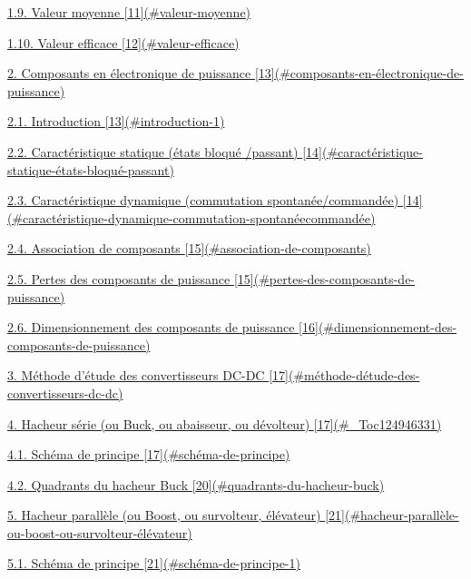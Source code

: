 \protect\hyperlink{valeur-moyenne}{1.9. Valeur moyenne {[}11{]}(\#valeur-moyenne)}

\protect\hyperlink{valeur-efficace}{1.10. Valeur efficace {[}12{]}(\#valeur-efficace)}

\protect\hyperlink{composants-en-uxe9lectronique-de-puissance}{2. Composants en électronique de puissance {[}13{]}(\#composants-en-électronique-de-puissance)}

\protect\hyperlink{introduction-1}{2.1. Introduction {[}13{]}(\#introduction-1)}

\protect\hyperlink{caractuxe9ristique-statique-uxe9tats-bloquuxe9-passant}{2.2. Caractéristique statique (états bloqué /passant) {[}14{]}(\#caractéristique-statique-états-bloqué-passant)}

\protect\hyperlink{caractuxe9ristique-dynamique-commutation-spontanuxe9ecommanduxe9e}{2.3. Caractéristique dynamique (commutation spontanée/commandée) {[}14{]}(\#caractéristique-dynamique-commutation-spontanéecommandée)}

\protect\hyperlink{association-de-composants}{2.4. Association de composants {[}15{]}(\#association-de-composants)}

\protect\hyperlink{pertes-des-composants-de-puissance}{2.5. Pertes des composants de puissance {[}15{]}(\#pertes-des-composants-de-puissance)}

\protect\hyperlink{dimensionnement-des-composants-de-puissance}{2.6. Dimensionnement des composants de puissance {[}16{]}(\#dimensionnement-des-composants-de-puissance)}

\protect\hyperlink{muxe9thode-duxe9tude-des-convertisseurs-dc-dc}{3. Méthode d'étude des convertisseurs DC-DC {[}17{]}(\#méthode-détude-des-convertisseurs-dc-dc)}

\protect\hyperlink{_Toc124946331}{4. Hacheur série (ou Buck, ou abaisseur, ou dévolteur) {[}17{]}(\#\_Toc124946331)}

\protect\hyperlink{schuxe9ma-de-principe}{4.1. Schéma de principe {[}17{]}(\#schéma-de-principe)}

\protect\hyperlink{quadrants-du-hacheur-buck}{4.2. Quadrants du hacheur Buck {[}20{]}(\#quadrants-du-hacheur-buck)}

\protect\hyperlink{hacheur-paralluxe8le-ou-boost-ou-survolteur-uxe9luxe9vateur}{5. Hacheur parallèle (ou Boost, ou survolteur, élévateur) {[}21{]}(\#hacheur-parallèle-ou-boost-ou-survolteur-élévateur)}

\protect\hyperlink{schuxe9ma-de-principe-1}{5.1. Schéma de principe {[}21{]}(\#schéma-de-principe-1)}

